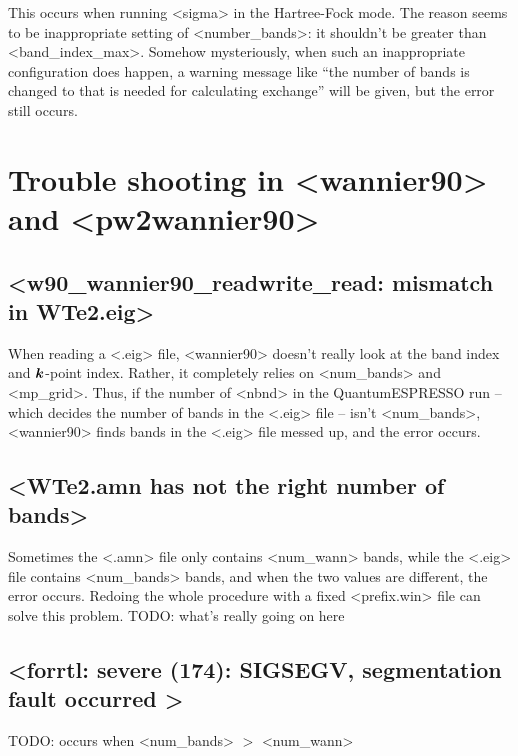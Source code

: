 \documentclass[hyperref, a4paper, 12pt]{report}
\def\texttt#1{<#1>}%
\newcommand{\shortcode}[1]{\texttt{#1}}
\begin{document}
This occurs when running \shortcode{sigma} 
in the Hartree-Fock mode.
The reason seems to be inappropriate setting of \shortcode{number_bands}:
it shouldn't be greater than \shortcode{band_index_max}.
Somehow mysteriously,
when such an inappropriate configuration does happen,
a warning message like ``the number of bands is changed to 
that is needed for calculating exchange''
will be given,
but the error still occurs.



\section{Trouble shooting in \shortcode{wannier90} and \shortcode{pw2wannier90}}

\subsection{\shortcode{w90_wannier90_readwrite_read: mismatch in WTe2.eig}}\label{sec:wannier.mismatch-eig}

When reading a \shortcode{.eig} file, 
\shortcode{wannier90} doesn't really look at the band index and $\vb*{k}$-point index.
Rather, it completely relies on \shortcode{num_bands} and \shortcode{mp_grid}.
Thus, if the number of \shortcode{nbnd} in the QuantumESPRESSO run -- 
which decides the number of bands in the \shortcode{.eig} file -- 
isn't \shortcode{num_bands}, 
\shortcode{wannier90} finds bands in the \shortcode{.eig} file messed up,
and the error occurs.

\subsection{\shortcode{WTe2.amn has not the right number of bands}}

Sometimes the \shortcode{.amn} file only contains 
\shortcode{num_wann} bands,
while the \shortcode{.eig} file contains \shortcode{num_bands} bands,
and when the two values are different,
the error occurs. 
Redoing the whole procedure with a fixed \shortcode{prefix.win} file 
can solve this problem.
TODO: what's really going on here

\subsection{\shortcode{forrtl: severe (174): SIGSEGV, segmentation fault occurred }}

TODO: occurs when \shortcode{num_bands} $>$ \shortcode{num_wann}
\end{document}

